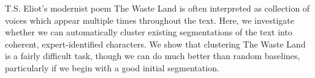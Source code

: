 T.S. Eliot's modernist poem The Waste Land is often interpreted as collection of voices which appear multiple times throughout the text. Here, we investigate
 whether we can automatically cluster existing segmentations of the text into
 coherent, expert-identified characters. We show that clustering The Waste Land
 is a fairly difficult task, though we can do much better than random baselines,
 particularly if we begin with a good initial segmentation.


